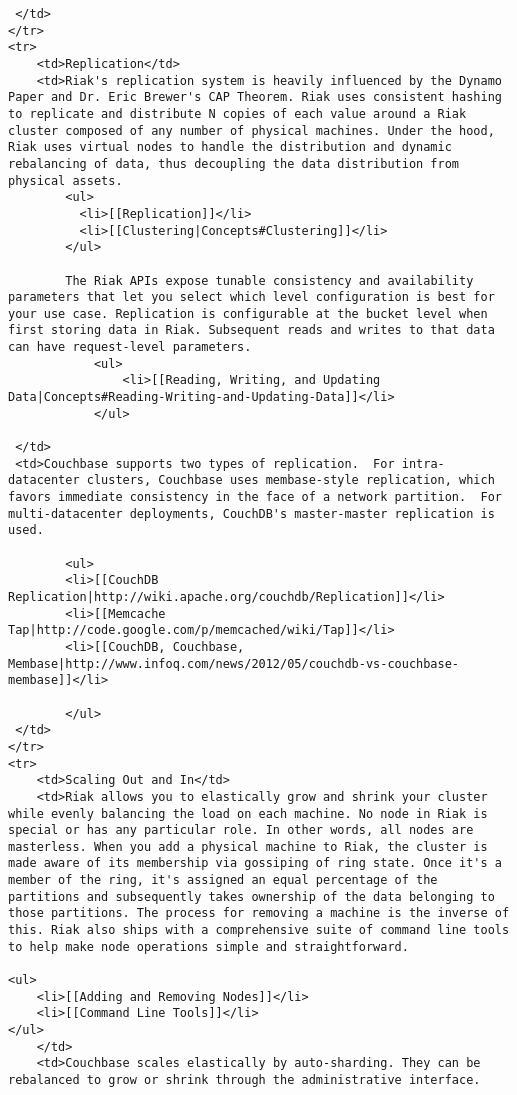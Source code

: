 \documentclass[letter]{book}
\begin{document}
\begin{shaded}
\begin{verbatim}
 </td>
</tr>
<tr>
    <td>Replication</td>
    <td>Riak's replication system is heavily influenced by the Dynamo Paper and Dr. Eric Brewer's CAP Theorem. Riak uses consistent hashing to replicate and distribute N copies of each value around a Riak cluster composed of any number of physical machines. Under the hood, Riak uses virtual nodes to handle the distribution and dynamic rebalancing of data, thus decoupling the data distribution from physical assets.
        <ul>
          <li>[[Replication]]</li>
          <li>[[Clustering|Concepts#Clustering]]</li>
        </ul>

        The Riak APIs expose tunable consistency and availability parameters that let you select which level configuration is best for your use case. Replication is configurable at the bucket level when first storing data in Riak. Subsequent reads and writes to that data can have request-level parameters.
            <ul>
                <li>[[Reading, Writing, and Updating Data|Concepts#Reading-Writing-and-Updating-Data]]</li>
            </ul>

 </td>
 <td>Couchbase supports two types of replication.  For intra-datacenter clusters, Couchbase uses membase-style replication, which favors immediate consistency in the face of a network partition.  For multi-datacenter deployments, CouchDB's master-master replication is used.

        <ul>
        <li>[[CouchDB Replication|http://wiki.apache.org/couchdb/Replication]]</li>
        <li>[[Memcache Tap|http://code.google.com/p/memcached/wiki/Tap]]</li>
        <li>[[CouchDB, Couchbase, Membase|http://www.infoq.com/news/2012/05/couchdb-vs-couchbase-membase]]</li>

        </ul>
 </td>
</tr>
<tr>
    <td>Scaling Out and In</td>
    <td>Riak allows you to elastically grow and shrink your cluster while evenly balancing the load on each machine. No node in Riak is special or has any particular role. In other words, all nodes are masterless. When you add a physical machine to Riak, the cluster is made aware of its membership via gossiping of ring state. Once it's a member of the ring, it's assigned an equal percentage of the partitions and subsequently takes ownership of the data belonging to those partitions. The process for removing a machine is the inverse of this. Riak also ships with a comprehensive suite of command line tools to help make node operations simple and straightforward.

<ul>
    <li>[[Adding and Removing Nodes]]</li>
    <li>[[Command Line Tools]]</li>
</ul>
    </td>
    <td>Couchbase scales elastically by auto-sharding. They can be rebalanced to grow or shrink through the administrative interface.


\end{verbatim}
\end{shaded}
\end{document}
